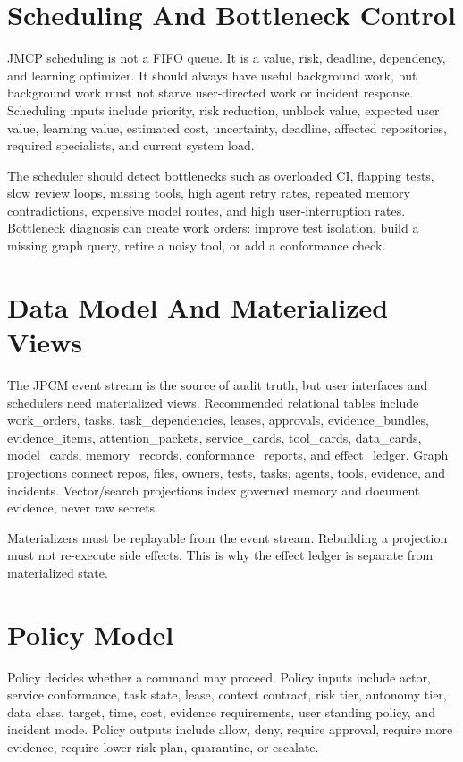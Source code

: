 \documentclass[10pt,journal,onecolumn]{IEEEtran}
\begin{document}
\section{Scheduling And Bottleneck Control}
JMCP scheduling is not a FIFO queue. It is a value, risk, deadline, dependency, and learning optimizer. It should always have useful background work, but background work must not starve user-directed work or incident response. Scheduling inputs include priority, risk reduction, unblock value, expected user value, learning value, estimated cost, uncertainty, deadline, affected repositories, required specialists, and current system load.

The scheduler should detect bottlenecks such as overloaded CI, flapping tests, slow review loops, missing tools, high agent retry rates, repeated memory contradictions, expensive model routes, and high user-interruption rates. Bottleneck diagnosis can create work orders: improve test isolation, build a missing graph query, retire a noisy tool, or add a conformance check.

\section{Data Model And Materialized Views}
The JPCM event stream is the source of audit truth, but user interfaces and schedulers need materialized views. Recommended relational tables include work\_orders, tasks, task\_dependencies, leases, approvals, evidence\_bundles, evidence\_items, attention\_packets, service\_cards, tool\_cards, data\_cards, model\_cards, memory\_records, conformance\_reports, and effect\_ledger. Graph projections connect repos, files, owners, tests, tasks, agents, tools, evidence, and incidents. Vector/search projections index governed memory and document evidence, never raw secrets.

Materializers must be replayable from the event stream. Rebuilding a projection must not re-execute side effects. This is why the effect ledger is separate from materialized state.

\section{Policy Model}
Policy decides whether a command may proceed. Policy inputs include actor, service conformance, task state, lease, context contract, risk tier, autonomy tier, data class, target, time, cost, evidence requirements, user standing policy, and incident mode. Policy outputs include allow, deny, require approval, require more evidence, require lower-risk plan, quarantine, or escalate.
\end{document}
